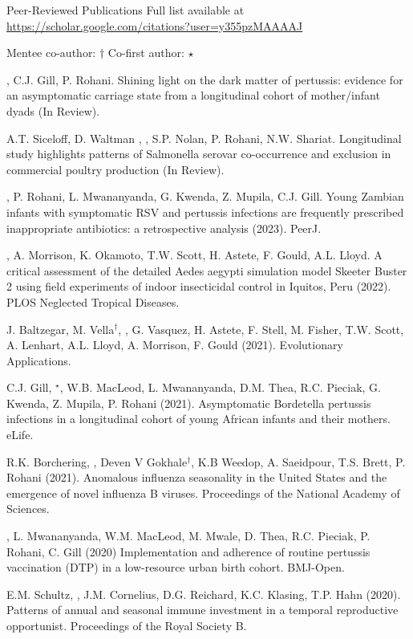\documentclass{resume} %
\begin{document}
\begin{rSection}{Peer-Reviewed Publications}
Full list available at \url{https://scholar.google.com/citations?user=y355pzMAAAAJ} 

Mentee co-author: $\dagger$ \quad Co-first author: $\star$


\authSelf, C.J. Gill, P. Rohani.
Shining light on the dark matter of pertussis: evidence for an asymptomatic carriage state from a longitudinal cohort of mother/infant dyads 
(In Review).

A.T. Siceloff, D. Waltman , \authSelf, S.P. Nolan, P. Rohani, N.W. Shariat.
Longitudinal study highlights patterns of Salmonella serovar co-occurrence and exclusion in commercial poultry production 
(In Review).

\authSelf, P. Rohani, L. Mwananyanda, G. Kwenda, Z. Mupila, C.J. Gill.
Young Zambian infants with symptomatic RSV and pertussis infections are frequently prescribed inappropriate antibiotics: a retrospective analysis (2023).
PeerJ.

\authSelf, A. Morrison, K. Okamoto, T.W. Scott, H. Astete, F. Gould,
A.L. Lloyd. A critical assessment of the detailed Aedes aegypti simulation model Skeeter Buster 2 using field experiments of indoor insecticidal control in Iquitos, Peru (2022).
PLOS Neglected Tropical Diseases.

J. Baltzegar, M. Vella$^\dagger$, \authSelf, G. Vasquez, H. Astete, F. Stell, M. Fisher, T.W. Scott, A. Lenhart, A.L. Lloyd, A. Morrison, F. Gould (2021). Evolutionary Applications.

C.J. Gill, \authSelf$^\star$, W.B. MacLeod, L. Mwananyanda, D.M. Thea, R.C. Pieciak, G. Kwenda, Z. Mupila, P. Rohani (2021).  Asymptomatic Bordetella pertussis infections in a longitudinal cohort of young African infants and their mothers. eLife.

R.K. Borchering, \authSelf, Deven V Gokhale$^\dagger$, K.B Weedop, A. Saeidpour, T.S. Brett, P. Rohani (2021).
Anomalous influenza seasonality in the United States and the emergence of novel influenza B viruses. Proceedings of the National Academy of Sciences.

\authSelf, L. Mwananyanda, W.M. MacLeod, M. Mwale, D. Thea, R.C.  Pieciak, P. Rohani, C. Gill (2020)
Implementation and adherence of routine pertussis vaccination (DTP) in a low-resource urban birth cohort. BMJ-Open.

E.M. Schultz, \authSelf, J.M. Cornelius, D.G. Reichard, K.C. Klasing, T.P. Hahn (2020). Patterns of annual and seasonal immune investment in a temporal reproductive opportunist. Proceedings of the Royal Society B.


\end{rSection}
\end{document}
